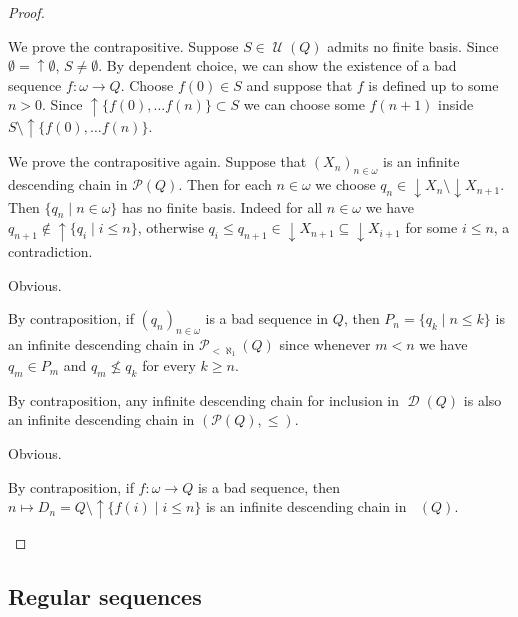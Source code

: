 \documentclass{article}%
\theoremstyle{plain}
\theoremstyle{definition}
\theoremstyle{remark}
\newcommand{\CtblSubs}{\mathcal{P}_{<\aleph_{1}}}
\DeclareMathOperator{\upcl}{\uparrow}
\DeclareMathOperator{\dcl}{\downarrow}
\DeclareMathOperator{\Down}{\mathcal{D}} %
\DeclareMathOperator{\DownFb}{\Down_{\text{fb}}} %
\DeclareMathOperator{\Final}{\mathcal{U}} %
\begin{document}
\begin{proof} 
\begin{descProofUp}
\item[\cref{Item:2}$ \to $\cref{Item:4}] We prove the contrapositive. Suppose $S\in\Final(Q)$ admits no finite basis. Since $\emptyset=\upcl \emptyset$, $S\neq \emptyset$. By dependent choice, we can show the existence of a bad sequence $f:\omega \to Q$. Choose $f(0)\in S$ and suppose that $f$ is defined up to some $n>0$. Since $\upcl \{f(0),\ldots f(n)\}\subset S$ we can choose some $f(n+1)$ inside $S\setminus \upcl \{f(0),\ldots f(n)\}$.

\item [\cref{Item:4}$ \to$\cref{Item:5}] We prove the contrapositive again. Suppose that $(X_{n})_{n\in\omega}$ is an infinite descending chain in $\mathcal{P}(Q)$. Then for each $n\in\omega$ we choose $q_{n}\in \dcl X_{n}\setminus \dcl X_{n+1}$. Then $\{q_{n}\mid n\in\omega\}$ has no finite basis. Indeed for all $n\in \omega$ we have $q_{n+1}\notin\upcl \{q_{i}\mid i\leq n\}$, otherwise $q_{i}\leq q_{n+1}\in \dcl X_{n+1}\subseteq \dcl X_{i+1}$ for some $i\leq n$, a contradiction.

\item[\cref{Item:5}$ \to $\cref{Item:5b}] Obvious.

\item[\cref{Item:5b}$ \to $\cref{Item:2}] By contraposition, if $(q_{n})_{n\in\omega}$ is a bad sequence in $Q$, then $P_{n}=\{q_{k}\mid n\leq k\}$ is an infinite descending chain in $\CtblSubs(Q)$ since whenever $m<n$ we have $q_{m}\in P_{m}$ and $q_{m}\nleq q_{k}$ for every $k\geq n$.

\item[\cref{Item:5}$ \to $\cref{Item:6}] By contraposition, any infinite descending chain for inclusion in $\Down(Q)$ is also an infinite descending chain in $(\mathcal{P}(Q),\leq)$.

\item[\cref{Item:6}$ \to $\cref{Item:6b}] Obvious.

\item[\cref{Item:6b}$\to$\cref{Item:2}] By contraposition, if $f:\omega\to Q$ is a bad sequence, then $n\mapsto D_{n}=Q\setminus \upcl \{f(i)\mid i\leq n\}$ is an infinite descending chain in $\DownFb(Q)$.\qedhere
\end{descProofUp}
\end{proof}

\subsection{Regular sequences}
\end{document}
